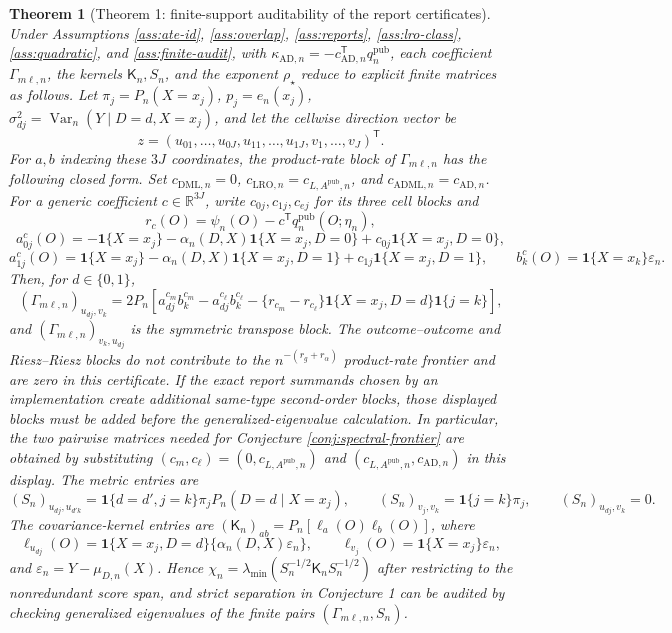 \documentclass[11pt]{article}
\newcommand{\one}{\mathbf{1}}
\newcommand{\transpose}{\mathsf{T}}
\newcommand{\R}{\mathbb{R}}
\theoremstyle{definition}
\theoremstyle{plain}
\newtheorem{theorem}{Theorem}
\theoremstyle{remark}
\begin{document}
\begin{theorem}[Theorem 1: finite-support auditability of the report certificates]\label{thm:finite-audit}
Under Assumptions \ref{ass:ate-id}, \ref{ass:overlap}, \ref{ass:reports},
\ref{ass:lro-class}, \ref{ass:quadratic}, and \ref{ass:finite-audit}, with
\(\kappa_{\mathrm{AD},n}=-c_{\mathrm{AD},n}^{\transpose}
q^{\mathrm{pub}}_n\), each
coefficient \(\Gamma_{m\ell,n}\), the kernels \(\mathsf K_n,S_n\), and the exponent
\(\rho_\star\) reduce to explicit finite matrices as follows.  Let
\(\pi_j=P_n(X=x_j)\), \(p_j=e_n(x_j)\),
\(\sigma_{dj}^2=\operatorname{Var}_n(Y\mid D=d,X=x_j)\), and let the
cellwise direction vector be
\[
z=(u_{01},\ldots,u_{0J},u_{11},\ldots,u_{1J},v_1,\ldots,v_J)^\transpose.
\]
For \(a,b\) indexing these \(3J\) coordinates, the product-rate block of
\(\Gamma_{m\ell,n}\) has the following closed form.  Set
\(c_{\mathrm{DML},n}=0\),
\(c_{\mathrm{LRO},n}=c_{L,A^{\mathrm{pub}},n}\), and
\(c_{\mathrm{ADML},n}=c_{\mathrm{AD},n}\).  For a generic coefficient
\(c\in\R^{3J}\), write \(c_{0j},c_{1j},c_{ej}\) for its three cell blocks and
\[
r_c(O)=\psi_n(O)-c^\transpose q^{\mathrm{pub}}_n(O;\eta_n),
\]
\[
a^{c}_{0j}(O)=-\one\{X=x_j\}-\alpha_n(D,X)\one\{X=x_j,D=0\}
  +c_{0j}\one\{X=x_j,D=0\},
\]
\[
a^{c}_{1j}(O)=\one\{X=x_j\}-\alpha_n(D,X)\one\{X=x_j,D=1\}
  +c_{1j}\one\{X=x_j,D=1\},
\qquad
b^{c}_{k}(O)=\one\{X=x_k\}\varepsilon_n .
\]
Then, for \(d\in\{0,1\}\),
\[
(\Gamma_{m\ell,n})_{u_{dj},v_k}
=2P_n\!\left[
a^{c_m}_{dj}b^{c_m}_{k}-a^{c_\ell}_{dj}b^{c_\ell}_{k}
-\{r_{c_m}-r_{c_\ell}\}\one\{X=x_j,D=d\}\one\{j=k\}
\right],
\]
and \((\Gamma_{m\ell,n})_{v_k,u_{dj}}\) is the symmetric transpose block.
The outcome--outcome and Riesz--Riesz blocks do not contribute to the
\(n^{-(r_g+r_\alpha)}\) product-rate frontier and are zero in this certificate.
If the exact report summands chosen by an implementation create additional
same-type second-order blocks, those displayed blocks must be added before
the generalized-eigenvalue calculation.  In particular, the two pairwise
matrices needed for Conjecture \ref{conj:spectral-frontier} are obtained by
substituting
\((c_m,c_\ell)=(0,c_{L,A^{\mathrm{pub}},n})\) and
\((c_{L,A^{\mathrm{pub}},n},c_{\mathrm{AD},n})\) in this display.
The metric entries are
\[
(S_n)_{u_{dj},u_{d'k}}=\one\{d=d',j=k\}\pi_jP_n(D=d\mid X=x_j),\qquad
(S_n)_{v_j,v_k}=\one\{j=k\}\pi_j,\qquad
(S_n)_{u_{dj},v_k}=0.
\]
The covariance-kernel entries are \((\mathsf K_n)_{ab}=P_n[\ell_a(O)\ell_b(O)]\), where
\[
\ell_{u_{dj}}(O)=\one\{X=x_j,D=d\}\{\alpha_n(D,X)\varepsilon_n\},\qquad
\ell_{v_j}(O)=\one\{X=x_j\}\varepsilon_n,
\]
and \(\varepsilon_n=Y-\mu_{D,n}(X)\).  Hence
\(\chi_n=\lambda_{\min}(S_n^{-1/2}\mathsf K_nS_n^{-1/2})\) after restricting to the
nonredundant score span, and strict separation in Conjecture 1 can be audited
by checking generalized eigenvalues of the finite pairs
\((\Gamma_{m\ell,n},S_n)\).
\end{theorem}
\end{document}

